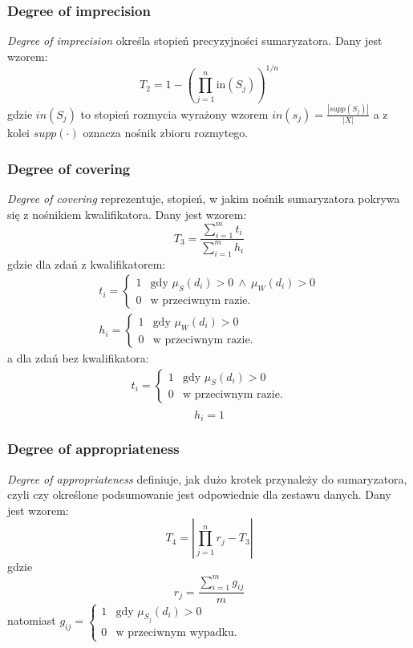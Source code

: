 \documentclass{classrep}
\begin{document}
	\subsubsection{Degree of imprecision}
\textsl{Degree of imprecision} określa stopień precyzyjności sumaryzatora. Dany jest wzorem:
	\begin{equation}
T_2 = 1 - \left(\prod_{j=1}^{n} \mathrm{in}(S_j)\right)^{1/n}
	\end{equation}
gdzie $in(S_j)$ to stopień rozmycia wyrażony wzorem
$
in(s_j) = \frac{|supp(S_j)|}{|X|}
$
a z kolei $supp(\cdot)$ oznacza nośnik zbioru rozmytego.


	\subsubsection{Degree of covering}
\textsl{Degree of covering} reprezentuje, stopień, w jakim nośnik sumaryzatora pokrywa się z nośnikiem kwalifikatora. Dany jest wzorem:
	\begin{equation}
T_3 = \frac{\sum_{i=1}^{m}t_i}{\sum_{i=1}^{m}h_i}
	\end{equation}
gdzie dla zdań z kwalifikatorem:
\[
\begin{array}{l}
t_i = \begin{cases}
1 & \mbox{gdy } \mu_{S}(d_i) > 0 ~ \wedge ~ \mu_{W}(d_i) > 0 \\
0 & \mbox{w przeciwnym razie.}
\end{cases} \\
h_i = \begin{cases}
1 & \mbox{gdy } \mu_{W}(d_i) > 0 \\
0 & \mbox{w przeciwnym razie.}
\end{cases}
\end{array}\]
a dla zdań bez kwalifikatora:
\[
\begin{array}{l}
t_i = \begin{cases}
1 & \mbox{gdy } \mu_{S}(d_i) > 0  \\
0 & \mbox{w przeciwnym razie.}
\end{cases} \\
\end{array}\]
\[h_i = 1\]



	\subsubsection{Degree of appropriateness}
\textsl{Degree of appropriateness} definiuje, jak dużo krotek przynależy do sumaryzatora, czyli czy określone podsumowanie jest odpowiednie dla zestawu danych. Dany jest wzorem:
\begin{equation}
T_4 = \left| \prod_{j=1}^{n} r_j - T_3\right|
\end{equation}
gdzie
\begin{equation}
r_j = \frac{\sum_{i=1}^{m} g_{ij}}{m}
\end{equation}
natomiast
$
g_{ij} = \begin{cases}
1 & \mbox{gdy } \mu_{S_j}(d_i) > 0 \\
0 & \mbox{w przeciwnym wypadku.}
\end{cases}
$
\end{document}
